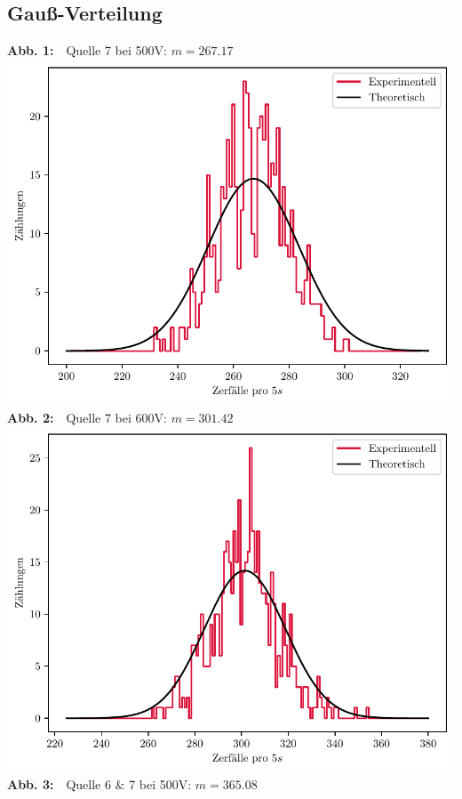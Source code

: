 \documentclass{article}
\begin{document}
	\subsection{Gauß-Verteilung}
	\begin{center}
	\vfill
	\textbf{Abb. 1:}$\quad$Quelle 7 bei 500V: $m=267.17$	
	\includegraphics[scale=0.8]{500V_Gauss.pdf}\\
	\vfill
	\textbf{Abb. 2:}$\quad$Quelle 7 bei 600V: $m=301.42$	
	\includegraphics[scale=0.8]{600V_Gauss.pdf}
	\vfill\newpage
	\textbf{Abb. 3:}$\quad$Quelle 6 \& 7 bei 500V: $m=365.08$	

\end{center}
\end{document}
